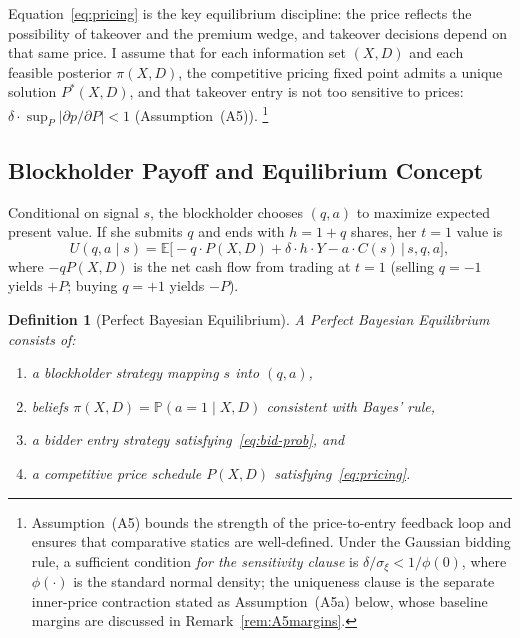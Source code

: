 \documentclass[11pt]{article}
\newtheorem{definition}{Definition}
\newcommand{\E}{\mathbb{E}}
\newcommand{\PP}{\mathbb{P}}
\newcommand{\1}{\mathbf{1}}
\begin{document}
Equation~\eqref{eq:pricing} is the key equilibrium discipline: the price reflects the possibility of takeover and the premium wedge, and takeover decisions depend on that same price. I assume that for each information set $(X,D)$ and each feasible posterior $\pi(X,D)$, the competitive pricing fixed point admits a unique solution $P^*(X,D)$, and that takeover entry is not too sensitive to prices: $\delta\cdot\sup_P|\partial p/\partial P|<1$ (Assumption~\textup{(A5)}).%
\footnote{Assumption~\textup{(A5)} bounds the strength of the price-to-entry feedback loop and ensures that comparative statics are well-defined. Under the Gaussian bidding rule, a sufficient condition \emph{for the sensitivity clause} is $\delta/\sigma_\xi < 1/\phi(0)$, where $\phi(\cdot)$ is the standard normal density; the uniqueness clause is the separate inner-price contraction stated as Assumption~\textup{(A5a)} below, whose baseline margins are discussed in Remark~\ref{rem:A5margins}.}

%
\subsection{Blockholder Payoff and Equilibrium Concept}
%

Conditional on signal $s$, the blockholder chooses $(q, a)$ to maximize expected present value. If she submits $q$ and ends with $h = 1 + q$ shares, her $t = 1$ value is
\[
U(q, a \mid s) = \E\Big[-q \cdot P(X,D) + \delta \cdot h \cdot Y - a \cdot C(s) \,\Big|\, s, q, a\Big],
\]
where $-qP(X,D)$ is the net cash flow from trading at $t = 1$ (selling $q = -1$ yields $+P$; buying $q = +1$ yields $-P$).

\begin{definition}[Perfect Bayesian Equilibrium]
A \emph{Perfect Bayesian Equilibrium} consists of:
\begin{enumerate}[label=(\roman{enumi})]
\item a blockholder strategy mapping $s$ into $(q, a)$,
\item beliefs $\pi(X,D) = \PP(a = 1 \mid X, D)$ consistent with Bayes' rule,
\item a bidder entry strategy satisfying~\eqref{eq:bid-prob}, and
\item a competitive price schedule $P(X,D)$ satisfying~\eqref{eq:pricing}.
\end{enumerate}
\end{definition}
\end{document}

